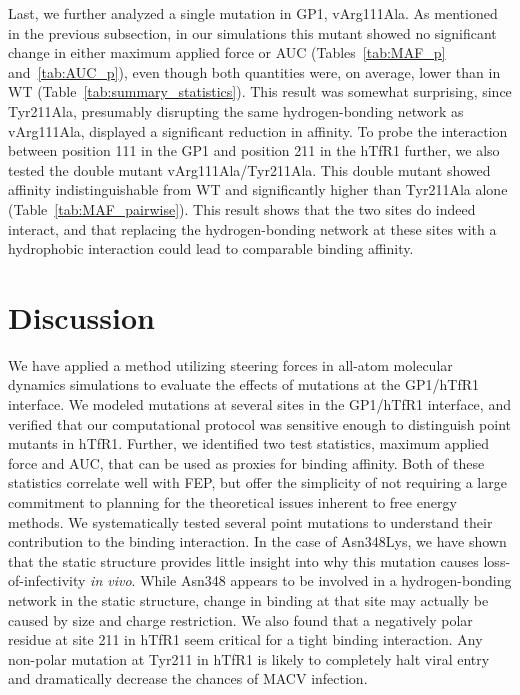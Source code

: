 \documentclass[12pt]{article}
\begin{document}
Last, we further analyzed a single mutation in GP1, vArg111Ala. As mentioned in the previous subsection, in our simulations this mutant showed no significant change in either maximum applied force or AUC (Tables~\ref{tab:MAF_p} and~\ref{tab:AUC_p}), even though both quantities were, on average, lower than in WT (Table~\ref{tab:summary_statistics}). This result was somewhat surprising, since Tyr211Ala, presumably disrupting the same hydrogen-bonding network as vArg111Ala, displayed a significant reduction in affinity. To probe the interaction between position 111 in the GP1 and position 211 in the hTfR1 further, we also tested the double mutant vArg111Ala/Tyr211Ala. This double mutant showed affinity indistinguishable from WT and significantly higher than Tyr211Ala alone  (Table~\ref{tab:MAF_pairwise}). This result shows that the two sites do indeed interact, and that replacing the hydrogen-bonding network at these sites with a hydrophobic interaction could lead to comparable binding affinity.

\section{Discussion}

We have applied a method utilizing steering forces in all-atom molecular dynamics simulations to evaluate the effects of mutations at the GP1/hTfR1 interface. We modeled mutations at several sites in the GP1/hTfR1 interface, and verified that our computational protocol was sensitive enough to distinguish point mutants in hTfR1. Further, we identified two test statistics, maximum applied force and AUC, that can be used as proxies for binding affinity. Both of these statistics correlate well with FEP, but offer the simplicity of not requiring a large commitment to planning for the theoretical issues inherent to free energy methods. We systematically tested several point mutations to understand their contribution to the binding interaction. In the case of Asn348Lys, we have shown that the static structure provides little insight into why this mutation causes loss-of-infectivity \textit{in vivo}. While Asn348 appears to be involved in a hydrogen-bonding network in the static structure, change in binding at that site may actually be caused by size and charge restriction. We also found that a negatively polar residue at site 211 in hTfR1 seem critical for a tight binding interaction. Any non-polar mutation at Tyr211 in hTfR1 is likely to completely halt viral entry and dramatically decrease the chances of MACV infection.
\end{document}
